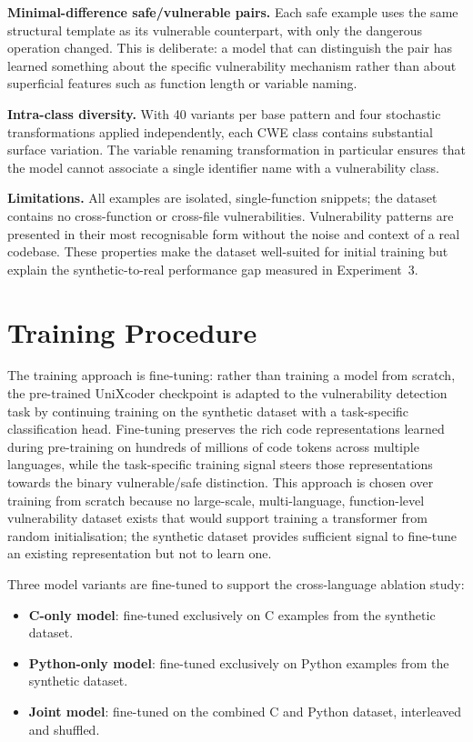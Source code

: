 \textbf{Minimal-difference safe/vulnerable pairs.}
Each safe example uses the same structural template as its vulnerable counterpart,
with only the dangerous operation changed.
This is deliberate: a model that can distinguish the pair has learned something about
the specific vulnerability mechanism rather than about superficial features such as
function length or variable naming.

\textbf{Intra-class diversity.}
With 40 variants per base pattern and four stochastic transformations applied
independently, each CWE class contains substantial surface variation.
The variable renaming transformation in particular ensures that the model cannot
associate a single identifier name with a vulnerability class.

\textbf{Limitations.}
All examples are isolated, single-function snippets; the dataset contains no
cross-function or cross-file vulnerabilities.
Vulnerability patterns are presented in their most recognisable form without the
noise and context of a real codebase.
These properties make the dataset well-suited for initial training but explain
the synthetic-to-real performance gap measured in Experiment~3.

\section{Training Procedure}

The training approach is fine-tuning: rather than training a model from scratch, the
pre-trained UniXcoder checkpoint is adapted to the vulnerability detection task by
continuing training on the synthetic dataset with a task-specific classification head.
Fine-tuning preserves the rich code representations learned during pre-training on
hundreds of millions of code tokens across multiple languages, while the task-specific
training signal steers those representations towards the binary vulnerable/safe distinction.
This approach is chosen over training from scratch because no large-scale, multi-language,
function-level vulnerability dataset exists that would support training a transformer from
random initialisation; the synthetic dataset provides sufficient signal to fine-tune an
existing representation but not to learn one.

Three model variants are fine-tuned to support the cross-language ablation study:
\begin{itemize}
  \item \textbf{C-only model}: fine-tuned exclusively on C examples from the synthetic dataset.
  \item \textbf{Python-only model}: fine-tuned exclusively on Python examples from the synthetic dataset.
  \item \textbf{Joint model}: fine-tuned on the combined C and Python dataset, interleaved and shuffled.
\end{itemize}

